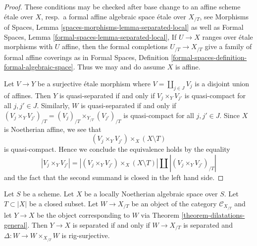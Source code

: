 \begin{proof}
These conditions may be checked after base change to an affine
scheme \'etale over $X$, resp.\ a formal affine algebraic space
\'etale over $X_{/T}$, see
Morphisms of Spaces, Lemma
\ref{spaces-morphisms-lemma-separated-local}
as well as
Formal Spaces, Lemma
\ref{formal-spaces-lemma-separated-local},
If $U \to X$ ranges over \'etale morphisms with $U$ affine, then
the formal completions $U_{/T} \to X_{/T}$ give a family
of formal affine coverings as in Formal Spaces, Definition
\ref{formal-spaces-definition-formal-algebraic-space}.
Thus we may and do assume $X$ is affine.

\medskip\noindent
Let $V \to Y$ be a surjective \'etale morphism
where $V = \coprod_{j \in J} V_j$ is a disjoint union of affines.
Then $Y$ is quasi-separated if and only if $V_j \times_Y V_{j'}$ is
quasi-compact for all $j, j' \in J$. Similarly, $W$ is quasi-separated
if and only if
$(V_j \times_Y V_{j'})_{/T} = (V_j)_{/T} \times_{Y_{/T}} (V_{j'})_{/T}$
is quasi-compact for all $j, j' \in J$. Since $X$ is Noetherian affine,
we see that
$$
(V_j \times_Y V_{j'}) \times_X (X \setminus T)
$$
is quasi-compact. Hence we conclude the equivalence holds by the equality
$$
|V_j \times_Y V_{j'}| =
|(V_j \times_Y V_{j'}) \times_X (X \setminus T)| \amalg
|(V_j \times_Y V_{j'})_{/T}|
$$
and the fact that the second summand is closed in the left hand side.
\end{proof}

\begin{lemma}
\label{lemma-output-separated}
Let $S$ be a scheme. Let $X$ be a locally Noetherian algebraic space over $S$.
Let $T \subset |X|$ be a closed subset. Let $W \to X_{/T}$ be an object
of the category $\mathcal{C}_{X_{/T}}$ and let $Y \to X$ be the object
corresponding to $W$ via Theorem \ref{theorem-dilatations-general}.
Then $Y \to X$ is separated if and only if $W \to X_{/T}$ is
separated and $\Delta : W \to W \times_{X_{/T}} W$ is rig-surjective.
\end{lemma}

